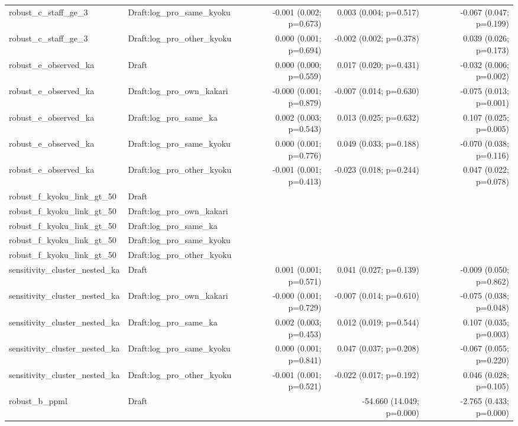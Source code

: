 \begin{table}[!htbp]
\begin{tabular}{llrrr}
robust_c_staff_ge_3 & Draft:log_pro_same_kyoku & -0.001 (0.002; p=0.673) & 0.003 (0.004; p=0.517) & -0.067 (0.047; p=0.199)
\\
robust_c_staff_ge_3 & Draft:log_pro_other_kyoku & 0.000 (0.001; p=0.694) & -0.002 (0.002; p=0.378) & 0.039 (0.026; p=0.173)
\\
robust_e_observed_ka & Draft & 0.000 (0.000; p=0.559) & 0.017 (0.020; p=0.431) & -0.032 (0.006; p=0.002)
\\
robust_e_observed_ka & Draft:log_pro_own_kakari & -0.000 (0.001; p=0.879) & -0.007 (0.014; p=0.630) & -0.075 (0.013; p=0.001)
\\
robust_e_observed_ka & Draft:log_pro_same_ka & 0.002 (0.003; p=0.543) & 0.013 (0.025; p=0.632) & 0.107 (0.025; p=0.005)
\\
robust_e_observed_ka & Draft:log_pro_same_kyoku & 0.000 (0.001; p=0.776) & 0.049 (0.033; p=0.188) & -0.070 (0.038; p=0.116)
\\
robust_e_observed_ka & Draft:log_pro_other_kyoku & -0.001 (0.001; p=0.413) & -0.023 (0.018; p=0.244) & 0.047 (0.022; p=0.078)
\\
robust_f_kyoku_link_gt_50 & Draft &  &  & 
\\
robust_f_kyoku_link_gt_50 & Draft:log_pro_own_kakari &  &  & 
\\
robust_f_kyoku_link_gt_50 & Draft:log_pro_same_ka &  &  & 
\\
robust_f_kyoku_link_gt_50 & Draft:log_pro_same_kyoku &  &  & 
\\
robust_f_kyoku_link_gt_50 & Draft:log_pro_other_kyoku &  &  & 
\\
sensitivity_cluster_nested_ka & Draft & 0.001 (0.001; p=0.571) & 0.041 (0.027; p=0.139) & -0.009 (0.050; p=0.862)
\\
sensitivity_cluster_nested_ka & Draft:log_pro_own_kakari & -0.000 (0.001; p=0.729) & -0.007 (0.014; p=0.610) & -0.075 (0.038; p=0.048)
\\
sensitivity_cluster_nested_ka & Draft:log_pro_same_ka & 0.002 (0.003; p=0.453) & 0.012 (0.019; p=0.544) & 0.107 (0.035; p=0.003)
\\
sensitivity_cluster_nested_ka & Draft:log_pro_same_kyoku & 0.000 (0.001; p=0.841) & 0.047 (0.037; p=0.208) & -0.067 (0.055; p=0.220)
\\
sensitivity_cluster_nested_ka & Draft:log_pro_other_kyoku & -0.001 (0.001; p=0.521) & -0.022 (0.017; p=0.192) & 0.046 (0.028; p=0.105)
\\
robust_b_ppml & Draft &  & -54.660 (14.049; p=0.000) & -2.765 (0.433; p=0.000)
\\

\end{tabular}
\end{table}
